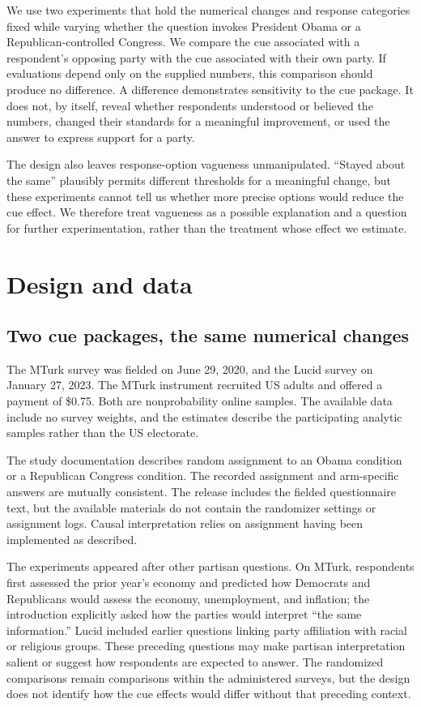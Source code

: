 \documentclass[11pt,letterpaper]{article}
\begin{document}
We use two experiments that hold the numerical changes and response categories fixed while varying whether the question invokes President Obama or a Republican-controlled Congress. We compare the cue associated with a respondent's opposing party with the cue associated with their own party. If evaluations depend only on the supplied numbers, this comparison should produce no difference. A difference demonstrates sensitivity to the cue package. It does not, by itself, reveal whether respondents understood or believed the numbers, changed their standards for a meaningful improvement, or used the answer to express support for a party.

The design also leaves response-option vagueness unmanipulated. ``Stayed about the same'' plausibly permits different thresholds for a meaningful change, but these experiments cannot tell us whether more precise options would reduce the cue effect. We therefore treat vagueness as a possible explanation and a question for further experimentation, rather than the treatment whose effect we estimate.

\section{Design and data}
\subsection{Two cue packages, the same numerical changes}
The MTurk survey was fielded on June 29, 2020, and the Lucid survey on January 27, 2023. The MTurk instrument recruited US adults and offered a payment of \$0.75. Both are nonprobability online samples. The available data include no survey weights, and the estimates describe the participating analytic samples rather than the US electorate.

The study documentation describes random assignment to an Obama condition or a Republican Congress condition. The recorded assignment and arm-specific answers are mutually consistent. The release includes the fielded questionnaire text, but the available materials do not contain the randomizer settings or assignment logs. Causal interpretation relies on assignment having been implemented as described.

The experiments appeared after other partisan questions. On MTurk, respondents first assessed the prior year's economy and predicted how Democrats and Republicans would assess the economy, unemployment, and inflation; the introduction explicitly asked how the parties would interpret ``the same information.'' Lucid included earlier questions linking party affiliation with racial or religious groups. These preceding questions may make partisan interpretation salient or suggest how respondents are expected to answer. The randomized comparisons remain comparisons within the administered surveys, but the design does not identify how the cue effects would differ without that preceding context.
\end{document}

